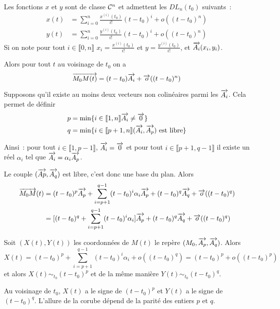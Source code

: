 Les fonctions \(x\) et \(y\) sont de classe \(\mathcal{C}^{n}\) et admettent les
\(DL_n(t_0)\) suivants~:
\begin{align*}
  x(t) &= \sum_{i = 0}^n \frac{x^{(i)}(t_0)}{i!} (t-t_0)^i + o((t-t_0)^n) \\
y(t) &= \sum_{i = 0}^n \frac{y^{(i)}(t_0)}{i!} (t-t_0)^i + o((t-t_0)^n)
\end{align*}
Si on note pour tout \(i \in \llbracket 0,n \rrbracket\)
\(x_i = \frac{x^{(i)}(t_0)}{i!}\) et \(y = \frac{y^{(i)}(t_0)}{i!}\), et
\(\overrightarrow{A_i}(x_i,y_i)\).

Alors pour tout \(t\) au voisinage de \(t_0\) on a
\begin{equation}
  \overrightarrow{M_0M(t)} = (t-t_0)\overrightarrow{A_i} +\overrightarrow{o}((t-t_0)^n)
\end{equation}


Supposons qu'il existe au moins deux vecteurs non colinéaires parmi les
\(\overrightarrow{A_i}\). Cela permet de définir
\begin{align*}
  p &= \min \{i \in \llbracket 1,n \rrbracket \overrightarrow{A_i} \neq \overrightarrow{0} \} \\
  q &= \min \{i \in \llbracket p+1,n \rrbracket (\overrightarrow{A_i},\overrightarrow{A_p})
  \text{~est libre}\}
\end{align*}

Ainsi~: pour tout \(i \in \llbracket 1, p-1 \rrbracket\),
\(\overrightarrow{A_i} = \overrightarrow{0}\) et pour tout \(i \in \llbracket p+1, q-1 \rrbracket\) il
existe un réel \(\alpha_i\) tel que \(\overrightarrow{A_i} = \alpha_i \overrightarrow{A_p}\).

Le couple \((\overrightarrow{Ap}, \overrightarrow{A_q})\) est libre, c'est donc une base du plan.
Alors
\begin{align*}
  \overrightarrow{M_0M}(t) &= (t-t_0)^p \overrightarrow{A_p} + \sum_{i = p+1}^{q-1} (t-t_0)^i \alpha_i
  \overrightarrow{A_p} +(t-t_0)^q \overrightarrow{A_q} +\overrightarrow{o}((t-t_0)^q) \\
  & = [(t-t_0)^q + \sum_{i = p+1}^{q-1} (t-t_0)^i \alpha_i]\overrightarrow{A_p} + (t-t_0)^q
  \overrightarrow{A_q} +\overrightarrow{o}((t-t_0)^q)
\end{align*}

Soit \((X(t),Y(t))\) les coordonnées de \(M(t)\) le repère
\((M_0,\overrightarrow{A_p},\overrightarrow{A_q})\). Alors
\begin{equation}
  X(t) = (t-t_0)^p+\sum_{i = p+1}^{q-1} (t-t_0)^i \alpha_i + o((t-t_0)^q) =
  (t-t_0)^p + o((t-t_0)^p)
\end{equation}
et alors \(X(t) \sim_{t_0} (t-t_0)^p\) et de la même manière \(Y(t)
\sim_{t_0}(t-t_0)^q\).

Au voisinage de \(t_0\), \(X(t)\) a le signe de \((t-t_0)^p\) et \(Y(t)\) a le
signe de \((t-t_0)^q\). L'allure de la corube dépend de la parité des entiers
\(p\) et \(q\).

